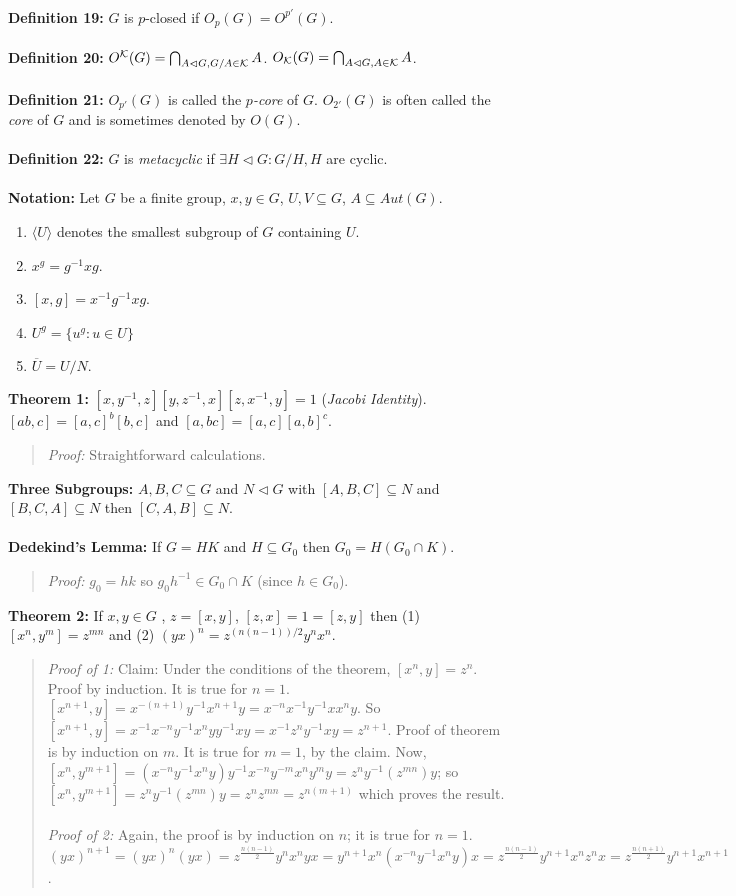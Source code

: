 \\
{\bf Definition 19:} $G$ is $p$-closed if $O_p(G)= O^{p'}(G)$.
\\
\\
{\bf Definition 20:} 
$O^{\cal K}(G)= \bigcap_{A \lhd G, G/A \in {\cal K}} A$.
$O_{\cal K}(G)= \bigcap_{A \lhd G, A \in {\cal K}} A$.
\\
\\
{\bf Definition 21:}
$O_{p'}(G)$ is called the $p$\emph{-core} of $G$. $O_{2'}(G)$ is often called the
\emph{core} of $G$ and is sometimes denoted by $O(G)$.
\\
\\
{\bf Definition 22:}
$G$ is 
\emph{metacyclic} if $\exists H \lhd G: G/H ,H$ are cyclic. 
\\
\\
{\bf Notation:}  Let $G$ be a finite group, $x, y \in G$, $U, V \subseteq G$,
$A \subseteq Aut(G)$.
\begin{enumerate}
\item $ \langle U \rangle $ denotes the smallest subgroup of $G$ containing $U$.
\item $x^g= g^{-1}xg$.
\item $[x,g]= x^{-1} g^{-1} x g$.
\item $U^g= \{ u^g: u \in U \}$
\item ${\overline U} = U/N$.
\end{enumerate}
{\bf Theorem 1:}
$ [x, y^{-1}, z] [y, z^{-1}, x] [z, x^{-1}, y]=1$
(\emph{Jacobi Identity}).
$[ab,c]= [a,c]^b [b,c]$ and $[a,bc]=[a,c] [a,b]^c$.  
\begin{quote}
\emph{Proof:} Straightforward calculations.
\end{quote}
{\bf Three Subgroups:} $A, B, C \subseteq G$ and
$N \lhd G$ with
$[A,B,C] \subseteq N$ and
$[B,C,A] \subseteq N$ then
$[C,A,B] \subseteq N$.
\\
\\
{\bf Dedekind's Lemma:}  If $G=HK$ and $H \subseteq G_0$ then $G_0 = H(G_0 \cap K)$.
\begin{quote}
\emph {Proof:} 
$g_0=hk$ so $g_0 h^{-1} \in G_0 \cap K$ (since $h \in G_0$).
\end{quote}
{\bf Theorem 2:}  If $x,y \in G$ , $z=[x,y]$, $[z, x]=1=[z,y]$ then (1) $[x^n, y^m]=z^{mn}$ and
(2) $(yx)^n= z^{(n(n-1))/2}y^n x^n$.
\begin{quote}
\emph {Proof of 1:} Claim: Under the conditions of the theorem, $[x^n,y]= z^n$.  Proof by induction.
It is true for $n=1$.  $[x^{n+1},y]= x^{-(n+1)}y^{-1}x^{n+1}y= x^{-n}x^{-1} y^{-1} x x^n y$.
So $[x^{n+1},y]= x^{-1} x^{-n} y^{-1} x^n y y^{-1} x y= x^{-1} z^n y^{-1} x y= z^{n+1}$.
Proof of theorem is by induction on $m$.  It is true for $m=1$, by the claim.  Now,
$[x^n,y^{m+1}]= (x^{-n} y^{-1} x^n y) y^{-1} x^{-n} y^{-m} x^n y^m y= z^n y^{-1} (z^{mn}) y$;
so $[x^n,y^{m+1}]= z^n y^{-1} (z^{mn}) y = z^n z^{mn}= z^{n(m+1)}$ which proves the result.
\\
\\
\emph {Proof of 2:} Again, the proof is by induction on $n$; it is true for $n=1$.
$(yx)^{n+1}= (yx)^n (yx)= 
z^{\frac {n(n-1)} {2}} y^n x^n y x= y^{n+1} x^n (x^{-n} y^{-1} x^n y) x
= z^{\frac {n(n-1)} {2}} y^{n+1} x^n z^n x= z^{\frac {n(n+1)} 2} y^{n+1} x^{n+1}$.
\end{quote}
